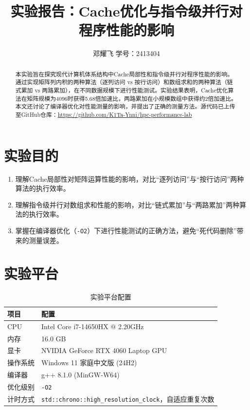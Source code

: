\documentclass[11pt,a4paper]{article}
\title{\textbf{实验报告：Cache优化与指令级并行对程序性能的影响}}
\author{邓耀飞 \quad 学号：2413404}
\date{}
\begin{document}
\maketitle
\thispagestyle{empty}

\begin{abstract}
本实验旨在探究现代计算机体系结构中Cache局部性和指令级并行对程序性能的影响。通过实现矩阵列内积的两种算法（逐列访问 vs 按行访问）和数组求和的两种算法（链式累加 vs 两路累加），在不同数据规模下进行性能测试。实验结果表明，Cache优化算法在矩阵规模为4096时获得5.68倍加速比，两路累加在小规模数组中获得约2倍加速比。本文还讨论了编译器优化对性能测量的影响，并提出了正确的测量方法。源代码已上传至GitHub仓库：\url{https://github.com/K1Ta-Ynni/hpc-performance-lab}
\end{abstract}

\tableofcontents
\newpage

\section{实验目的}

\begin{enumerate}
    \item 理解Cache局部性对矩阵运算性能的影响，对比“逐列访问”与“按行访问”两种算法的执行效率。
    \item 理解指令级并行对数组求和性能的影响，对比“链式累加”与“两路累加”两种算法的执行效率。
    \item 掌握在编译器优化（\texttt{-O2}）下进行性能测试的正确方法，避免“死代码删除”带来的测量误差。
\end{enumerate}

\section{实验平台}

\begin{table}[h]
\centering
\caption{实验平台配置}
\begin{tabular}{|l|l|}
\hline
\textbf{项目} & \textbf{配置} \\
\hline
CPU & Intel Core i7-14650HX @ 2.20GHz \\
\hline
内存 & 16.0 GB \\
\hline
显卡 & NVIDIA GeForce RTX 4060 Laptop GPU \\
\hline
操作系统 & Windows 11 家庭中文版 (24H2) \\
\hline
编译器 & g++ 8.1.0 (MinGW-W64) \\
\hline
优化级别 & \texttt{-O2} \\
\hline
计时方式 & \texttt{std::chrono::high\_resolution\_clock}，自适应重复次数 \\
\hline
\end{tabular}
\end{table}
\end{document}
